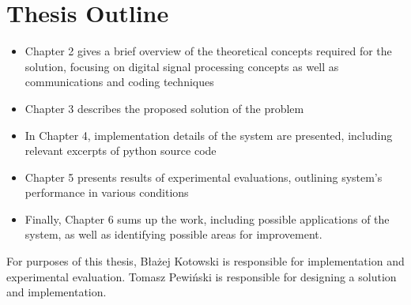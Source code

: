\section{Thesis Outline}

\begin{itemize}
  \item Chapter 2 gives a brief overview of the theoretical concepts required for the solution, focusing on digital signal processing concepts as well as communications and coding techniques
  \item Chapter 3 describes the proposed solution of the problem
  \item In Chapter 4, implementation details of the system are presented, including relevant excerpts of python source code
  \item Chapter 5 presents results of experimental evaluations, outlining system's performance in various conditions
  \item Finally, Chapter 6 sums up the work, including possible applications of the system, as well as identifying possible areas for improvement.
\end{itemize}

For purposes of this thesis, Błażej Kotowski is responsible for implementation and experimental evaluation. Tomasz Pewiński is responsible for designing a solution and implementation.
